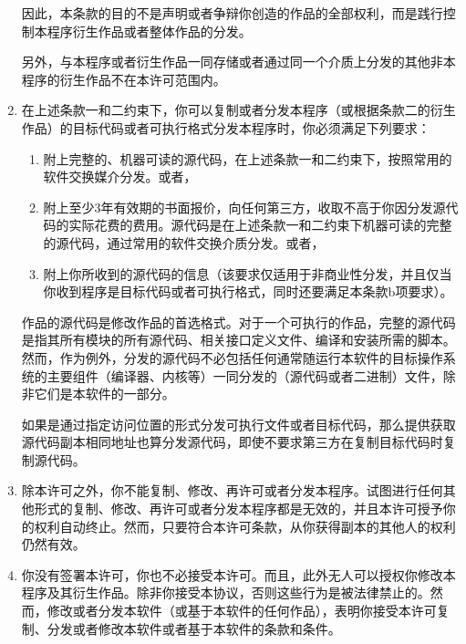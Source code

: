 \documentclass[11pt]{article}
\begin{document}
\begin{enumerate}
因此，本条款的目的不是声明或者争辩你创造的作品的全部权利，而是践行控制本程序衍生作品或者整体作品的分发。

另外，与本程序或者衍生作品一同存储或者通过同一个介质上分发的其他非本程序的衍生作品不在本许可范围内。

\item
在上述条款一和二约束下，你可以复制或者分发本程序（或根据条款二的衍生作品）的目标代码或者可执行格式分发本程序时，你必须满足下列要求：

\begin{enumerate}

\item

附上完整的、机器可读的源代码，在上述条款一和二约束下，按照常用的软件交换媒介分发。或者，

\item

附上至少3年有效期的书面报价，向任何第三方，收取不高于你因分发源代码的实际花费的费用。源代码是在上述条款一和二约束下机器可读的完整的源代码，通过常用的软件交换介质分发。或者，

\item

附上你所收到的源代码的信息（该要求仅适用于非商业性分发，并且仅当你收到程序是目标代码或者可执行格式，同时还要满足本条款b项要求）。

\end{enumerate}

作品的源代码是修改作品的首选格式。对于一个可执行的作品，完整的源代码是指其所有模块的所有源代码、相关接口定义文件、编译和安装所需的脚本。然而，作为例外，分发的源代码不必包括任何通常随运行本软件的目标操作系统的主要组件（编译器、内核等）一同分发的（源代码或者二进制）文件，除非它们是本软件的一部分。

如果是通过指定访问位置的形式分发可执行文件或者目标代码，那么提供获取源代码副本相同地址也算分发源代码，即使不要求第三方在复制目标代码时复制源代码。

\item
除本许可之外，你不能复制、修改、再许可或者分发本程序。试图进行任何其他形式的复制、修改、再许可或者分发本程序都是无效的，并且本许可授予你的权利自动终止。然而，只要符合本许可条款，从你获得副本的其他人的权利仍然有效。

\item
你没有签署本许可，你也不必接受本许可。而且，此外无人可以授权你修改本程序及其衍生作品。除非你接受本协议，否则这些行为是被法律禁止的。然而，修改或者分发本软件（或基于本软件的任何作品），表明你接受本许可复制、分发或者修改本软件或者基于本软件的条款和条件。


\end{enumerate}
\end{document}
